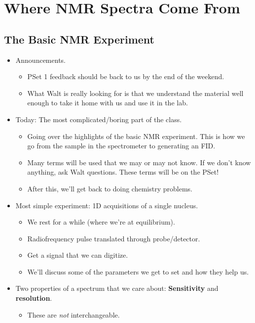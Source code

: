 \documentclass[../notes.tex]{subfiles}
\begin{document}
\chapter{Where NMR Spectra Come From}
\section{The Basic NMR Experiment}
\begin{itemize}
    \item {}Announcements.
    \begin{itemize}
        \item PSet 1 feedback should be back to us by the end of the weekend.
        \item What Walt is really looking for is that we understand the material well enough to take it home with us and use it in the lab.
    \end{itemize}
    \item Today: The most complicated/boring part of the class.
    \begin{itemize}
        \item Going over the highlights of the basic NMR experiment. This is how we go from the sample in the spectrometer to generating an FID.
        \item Many terms will be used that we may or may not know. If we don't know anything, ask Walt questions. These terms will be on the PSet!
        \item After this, we'll get back to doing chemistry problems.
    \end{itemize}
    \item Most simple experiment: 1D acquisitions of a single nucleus.
    \begin{itemize}
        \item We rest for a while (where we're at equilibrium).
        \item Radiofrequency pulse translated through probe/detector.
        \item Get a signal that we can digitize.
        \item We'll discuss some of the parameters we get to set and how they help us.
    \end{itemize}
    \item Two properties of a spectrum that we care about: \textbf{Sensitivity} and \textbf{resolution}.
    \begin{itemize}
        \item These are \emph{not} interchangeable.

\end{itemize}
\end{itemize}
\end{document}
